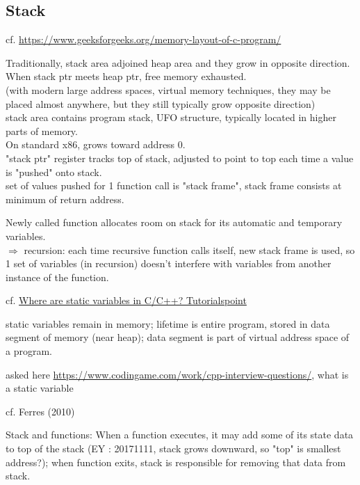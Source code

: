 \documentclass[10pt]{amsart}
\begin{document}
\subsection{Stack}


cf. \url{https://www.geeksforgeeks.org/memory-layout-of-c-program/}

Traditionally, stack area adjoined heap area and they grow in opposite direction. \\
When stack ptr meets heap ptr, free memory exhausted. \\
(with modern large address spaces, virtual memory techniques, they may be placed almost anywhere, but they still typically grow opposite direction)  \\

stack area contains program stack, UFO structure, typically located in higher parts of memory. \\
On standard x86, grows toward address 0. \\
"stack ptr" register tracks top of stack, adjusted to point to top each time a value is "pushed" onto stack. \\
set of values pushed for 1 function call is "stack frame", stack frame consists at minimum of return address. 

Newly called function allocates room on stack for its automatic and temporary variables. \\
$\Longrightarrow$ recursion: each time recursive function calls itself, new stack frame is used, so 1 set of variables (in recursion) doesn't interfere with variables from another instance of the function. 

cf. \href{https://www.tutorialspoint.com/where-are-static-variables-stored-in-c-cplusplus}{Where are static variables in C/C++? Tutorialspoint}

static variables remain in memory; lifetime is entire program, stored in data segment of memory (near heap); data segment is part of virtual address space of a program.

asked here \url{https://www.codingame.com/work/cpp-interview-questions/}, what is a static variable



cf. Ferres (2010) \cite{Ferr2010}

Stack and functions: When a function executes, it may add some of its state data to top of the stack (EY : 20171111, stack grows downward, so "top" is smallest address?); when function exits, stack is responsible for removing that data from stack.  
\end{document}
